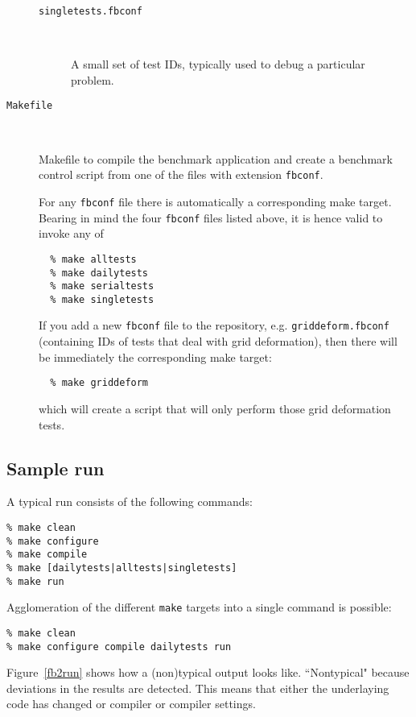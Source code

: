 \begin{description}
\begin{description}
  \item[\texttt{singletests.fbconf}] \

    A small set of test IDs, typically used to debug a particular problem.

  \end{description}

\item[\texttt{Makefile}] \

  Makefile to compile the benchmark application and create a benchmark
  control script from one of the files with extension \texttt{fbconf}.

  For any \texttt{fbconf} file there is automatically a corresponding make target.
  Bearing in mind the four \texttt{fbconf} files listed above, it is hence valid
  to invoke any of
  \begin{verbatim}
  % make alltests
  % make dailytests
  % make serialtests
  % make singletests
  \end{verbatim}
  If you add a new \texttt{fbconf} file to the repository, e.g. \texttt{griddeform.fbconf}
  (containing IDs of tests that deal with grid deformation), then there
  will be immediately the corresponding make target:
  \begin{verbatim}
  % make griddeform
  \end{verbatim}
  which will create a script that will only perform those grid deformation
  tests.

\end{description}



\subsection{Sample run}
\label{sec:fbenchmark2:sample_run}

A typical run consists of the following commands:

\begin{verbatim}
% make clean
% make configure
% make compile
% make [dailytests|alltests|singletests]
% make run
\end{verbatim}
Agglomeration of the different \texttt{make} targets into a single
command is possible:
\begin{verbatim}
% make clean
% make configure compile dailytests run
\end{verbatim}

Figure~\ref{fb2run} shows how a (non)typical output looks like. ``Nontypical"
because deviations in the results are detected. This means that either the
underlaying code has changed or compiler or compiler settings.

